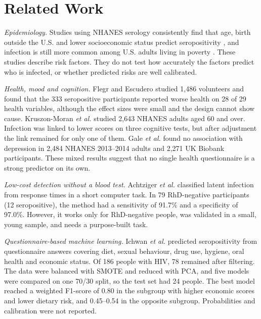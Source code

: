 \documentclass[conference]{IEEEtran}
\begin{document}
\section{Related Work}

\textit{Epidemiology.} Studies using NHANES serology consistently find that age, birth outside the U.S. and lower socioeconomic status predict seropositivity \cite{jones2014}, and infection is still more common among U.S. adults living in poverty \cite{cuffey2021}. These studies describe risk factors. They do not test how accurately the factors predict who is infected, or whether predicted risks are well calibrated.

\textit{Health, mood and cognition.} Flegr and Escudero \cite{flegr2016} studied 1,486 volunteers and found that the 333 seropositive participants reported worse health on 28 of 29 health variables, although the effect sizes were small and the design cannot show cause. Kruszon-Moran \textit{et al.} \cite{kruszon2023} studied 2,643 NHANES adults aged 60 and over. Infection was linked to lower scores on three cognitive tests, but after adjustment the link remained for only one of them. Gale \textit{et al.} \cite{gale2021} found no association with depression in 2,484 NHANES 2013--2014 adults and 2,271 UK Biobank participants. These mixed results suggest that no single health questionnaire is a strong predictor on its own.

\textit{Low-cost detection without a blood test.} Achtziger \textit{et al.} \cite{achtziger2025} classified latent infection from response times in a short computer task. In 79 RhD-negative participants (12 seropositive), the method had a sensitivity of 91.7\% and a specificity of 97.0\%. However, it works only for RhD-negative people, was validated in a small, young sample, and needs a purpose-built task.

\textit{Questionnaire-based machine learning.} Ichwan \textit{et al.} \cite{ichwan} predicted seropositivity from questionnaire answers covering diet, sexual behaviour, drug use, hygiene, oral health and economic status. Of 186 people with HIV, 78 remained after filtering. The data were balanced with SMOTE and reduced with PCA, and five models were compared on one 70/30 split, so the test set had 24 people. The best model reached a weighted F1-score of 0.80 in the subgroup with higher economic scores and lower dietary risk, and 0.45--0.54 in the opposite subgroup. Probabilities and calibration were not reported.
\end{document}
